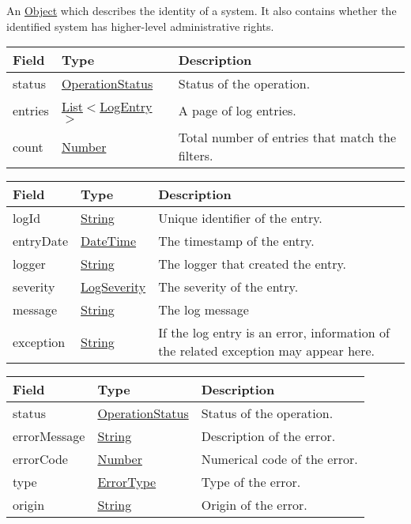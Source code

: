 \documentclass[a4paper]{arrowhead}
\newcommand{\pref}[1]{{\textcolor{ArrowheadGrey}{\hyperref[sec:model:primitives:#1]{#1}}}}
\begin{document}

An \pref{Object} which describes the identity of a system. It also contains whether the identified system has higher-level administrative rights.


\begin{table}[ht!]
\begin{tabularx}{\textwidth}{| p{2.5cm} | p{2.5cm} | X |} \hline
\rowcolor{gray!33} Field & Type      & Description \\ \hline
status & \pref{OperationStatus} & Status of the operation. \\ \hline
entries & \pref{List}$<$\hyperref[sec:model:LogEntry]{LogEntry}$>$ & A page of log entries. \\ \hline
count & \pref{Number} & Total number of entries that match the filters. \\ \hline
\end{tabularx}
\end{table}

\clearpage

 
\begin{table}[ht!]
\begin{tabularx}{\textwidth}{| p{2.5cm} | p{2.5cm} | X |} \hline
\rowcolor{gray!33} Field & Type      & Description \\ \hline
logId & \pref{String} & Unique identifier of the entry. \\ \hline
entryDate & \pref{DateTime} & The timestamp of the entry. \\ \hline
logger & \pref{String} & The logger that created the entry. \\ \hline
severity & \pref{LogSeverity} & The severity of the entry. \\ \hline
message & \pref{String} & The log message \\ \hline
exception & \pref{String} & If the log entry is an error, information of the related exception may appear here. \\ \hline
\end{tabularx}
\end{table}


\begin{table}[ht!]
\begin{tabularx}{\textwidth}{| p{2.5cm} | p{3cm} | X |} \hline
\rowcolor{gray!33} Field & Type      & Description \\ \hline
status & \pref{OperationStatus} & Status of the operation. \\ \hline
errorMessage & \pref{String} & Description of the error. \\ \hline
errorCode &\pref{Number}  & Numerical code of the error. \\ \hline
type & \pref{ErrorType} & Type of the error. \\ \hline
origin & \pref{String} & Origin of the error. \\ \hline
\end{tabularx}
\end{table}
\end{document}
